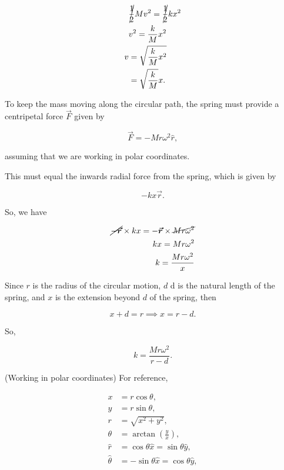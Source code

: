 \documentclass{homework}
\begin{document}
\begin{align*}
    &\cancel{\frac{1}{2}}Mv^2 = \cancel{\frac{1}{2}}kx^2 \\
    &v^2 = \frac{k}{M}x^2 \\
    v &= \sqrt{\frac{k}{M}x^2} \\
    &= \sqrt{\frac{k}{M}}x.
\end{align*}

\exercise

To keep the mass moving along the circular path, the spring must provide a centripetal force $\vec{F}$ given by

\begin{equation*}
    \vec{F} = -Mr\omega^2 \hat{r},
\end{equation*}

assuming that we are working in polar coordinates.

This must equal the inwards radial force from the spring, which is given by

\begin{equation*}
    -kx\vec{r}.
\end{equation*}

So, we have

\begin{align*}
    \cancel{-\vec{r}} \times kx = -\vec{r} \times \cancel{Mr\omega^2}  \\
    kx = Mr\omega^2 \\
    k = \frac{Mr\omega^2}{x}
\end{align*}

Since $r$ is the radius of the circular motion, $d$ d is the natural length of the spring,
and $x$ is the extension beyond $d$ of the spring, then 

\begin{equation*}
    x + d = r \implies x = r - d.
\end{equation*}

So,

\begin{equation*}
    k = \frac{Mr\omega^2}{r - d}.
\end{equation*}

\exercise

(Working in polar coordinates)
For reference,

\begin{align*}
    x &= r\cos\theta, \\
    y &= r\sin\theta, \\
    r &= \sqrt{x^2 + y^2}, \\
    \theta &= \arctan\left(\frac{y}{x}\right), \\
    \hat{r} &= \cos\theta \hat{x} = \sin\theta \hat{y}, \\
    \hat{\theta} &= -\sin\theta \hat{x} = \cos\theta \hat{y},
\end{align*}
\end{document}
